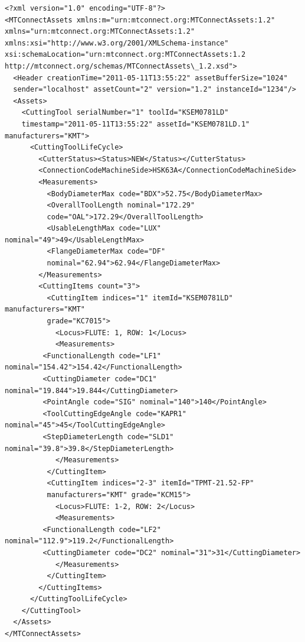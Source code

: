 \begin{lstlisting}[firstnumber=1,escapechar=|,% 
caption={Example for Step Drill with Explicate Loci}, label={lst:step-drill-with-explicate-loci}]
<?xml version="1.0" encoding="UTF-8"?>
<MTConnectAssets xmlns:m="urn:mtconnect.org:MTConnectAssets:1.2" 
xmlns="urn:mtconnect.org:MTConnectAssets:1.2" 
xmlns:xsi="http://www.w3.org/2001/XMLSchema-instance" 
xsi:schemaLocation="urn:mtconnect.org:MTConnectAssets:1.2 
http://mtconnect.org/schemas/MTConnectAssets\_1.2.xsd">
  <Header creationTime="2011-05-11T13:55:22" assetBufferSize="1024" 
  sender="localhost" assetCount="2" version="1.2" instanceId="1234"/>
  <Assets>
    <CuttingTool serialNumber="1" toolId="KSEM0781LD" 
    timestamp="2011-05-11T13:55:22" assetId="KSEM0781LD.1" manufacturers="KMT">
      <CuttingToolLifeCycle>
        <CutterStatus><Status>NEW</Status></CutterStatus>
        <ConnectionCodeMachineSide>HSK63A</ConnectionCodeMachineSide>
        <Measurements>
          <BodyDiameterMax code="BDX">52.75</BodyDiameterMax>
          <OverallToolLength nominal="172.29" 
          code="OAL">172.29</OverallToolLength>
          <UsableLengthMax code="LUX" nominal="49">49</UsableLengthMax>
          <FlangeDiameterMax code="DF" 
          nominal="62.94">62.94</FlangeDiameterMax>
        </Measurements>
        <CuttingItems count="3">
          <CuttingItem indices="1" itemId="KSEM0781LD" manufacturers="KMT" 
          grade="KC7015">
            <Locus>FLUTE: 1, ROW: 1</Locus>
            <Measurements>
         <FunctionalLength code="LF1" nominal="154.42">154.42</FunctionalLength>
         <CuttingDiameter code="DC1" nominal="19.844">19.844</CuttingDiameter>
         <PointAngle code="SIG" nominal="140">140</PointAngle>
         <ToolCuttingEdgeAngle code="KAPR1" nominal="45">45</ToolCuttingEdgeAngle>
         <StepDiameterLength code="SLD1" nominal="39.8">39.8</StepDiameterLength>
            </Measurements>
          </CuttingItem>
          <CuttingItem indices="2-3" itemId="TPMT-21.52-FP" 
          manufacturers="KMT" grade="KCM15">
            <Locus>FLUTE: 1-2, ROW: 2</Locus>
            <Measurements>
         <FunctionalLength code="LF2" nominal="112.9">119.2</FunctionalLength>
         <CuttingDiameter code="DC2" nominal="31">31</CuttingDiameter>
            </Measurements>
          </CuttingItem>
        </CuttingItems>
      </CuttingToolLifeCycle>
    </CuttingTool>
  </Assets>
</MTConnectAssets>
\end{lstlisting}

\pagebreak

